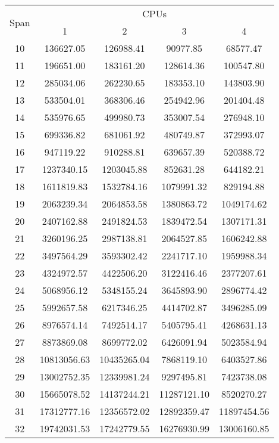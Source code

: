 \documentclass[paper=a4, fontsize=11pt]{scrartcl} %
\numberwithin{equation}{section} %
\numberwithin{figure}{section} %
\numberwithin{table}{section} %
\begin{document}
\begin{table}[H]
\centering
\begin{tabular}{|c|c|c|c|c|}
	\hline
	\multirow{ 2}{*}{Span} & \multicolumn{4}{|c|}{CPUs} \\ 
	 & 1 & 2 & 3 & 4 \\ \hline
	10 & 136627.05 & 126988.41 & 90977.85 & 68577.47 \\ \hline
11 & 196651.00 & 183161.20 & 128614.36 & 100547.80 \\ \hline
12 & 285034.06 & 262230.65 & 183353.10 & 143803.90 \\ \hline
13 & 533504.01 & 368306.46 & 254942.96 & 201404.48 \\ \hline
14 & 535976.65 & 499980.73 & 353007.54 & 276948.10 \\ \hline
15 & 699336.82 & 681061.92 & 480749.87 & 372993.07 \\ \hline
16 & 947119.22 & 910288.81 & 639657.39 & 520388.72 \\ \hline
17 & 1237340.15 & 1203045.88 & 852631.28 & 644182.21 \\ \hline
18 & 1611819.83 & 1532784.16 & 1079991.32 & 829194.88 \\ \hline
19 & 2063239.34 & 2064853.58 & 1380863.72 & 1049174.62 \\ \hline
20 & 2407162.88 & 2491824.53 & 1839472.54 & 1307171.31 \\ \hline
21 & 3260196.25 & 2987138.81 & 2064527.85 & 1606242.88 \\ \hline
22 & 3497564.29 & 3593302.42 & 2241717.10 & 1959988.34 \\ \hline
23 & 4324972.57 & 4422506.20 & 3122416.46 & 2377207.61 \\ \hline
24 & 5068956.12 & 5348155.24 & 3645893.90 & 2896774.42 \\ \hline
25 & 5992657.58 & 6217346.25 & 4414702.87 & 3496285.09 \\ \hline
26 & 8976574.14 & 7492514.17 & 5405795.41 & 4268631.13 \\ \hline
27 & 8873869.08 & 8699772.02 & 6426091.94 & 5023584.94 \\ \hline
28 & 10813056.63 & 10435265.04 & 7868119.10 & 6403527.86 \\ \hline
29 & 13002752.35 & 12339981.24 & 9297495.81 & 7423738.08 \\ \hline
30 & 15665078.52 & 14137244.21 & 11287121.10 & 8520270.27 \\ \hline
31 & 17312777.16 & 12356572.02 & 12892359.47 & 11897454.56 \\ \hline
32 & 19742031.53 & 17242779.55 & 16276930.99 & 13006160.85 \\ \hline

\end{tabular}
\end{table}
\end{document}
